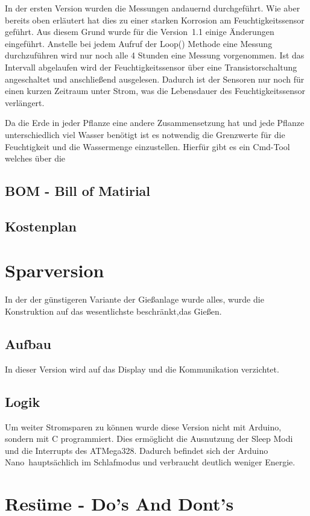 ﻿\documentclass[]{IEEEtran}
\begin{document}
	In der ersten Version wurden die Messungen andauernd durchgeführt. Wie aber bereits oben erläutert hat dies zu einer starken Korrosion am Feuchtigkeitssensor geführt. Aus diesem Grund wurde für die Version~1.1 einige Änderungen eingeführt. Anstelle bei jedem Aufruf der Loop() Methode eine Messung durchzuführen wird nur noch alle 4 Stunden eine Messung vorgenommen. Ist das Intervall abgelaufen wird der Feuchtigkeitssensor über eine Transistorschaltung angeschaltet und anschließend ausgelesen. Dadurch ist der Sensoren nur noch für einen kurzen Zeitraum unter Strom, was die Lebensdauer des Feuchtigkeitssensor verlängert.
		
	
	Da die Erde in jeder Pflanze eine andere Zusammensetzung hat und jede Pflanze unterschiedlich viel Wasser benötigt ist es notwendig die Grenzwerte für die Feuchtigkeit und die Wassermenge einzustellen. Hierfür gibt es ein Cmd-Tool welches über die 
	

	
\subsection{BOM - Bill of Matirial}
	
\subsection{Kostenplan}
	
	
\section{Sparversion}
	In der der günstigeren Variante der Gießanlage wurde alles, wurde die Konstruktion auf das wesentlichste beschränkt,das Gießen.
	\subsection{Aufbau}
	In dieser Version wird auf das Display und die Kommunikation verzichtet.
	
	\subsection{Logik}
	Um weiter Stromsparen zu können wurde diese Version nicht mit Arduino, sondern mit C programmiert.
	Dies ermöglicht die Ausnutzung der Sleep Modi und die Interrupts des ATMega328. 
	Dadurch befindet sich der \glqq Arduino Nano\grqq \ hauptsächlich im Schlafmodus und verbraucht deutlich weniger Energie. 

	
	\section{Resüme - Do's And Dont's}	
\end{document}
